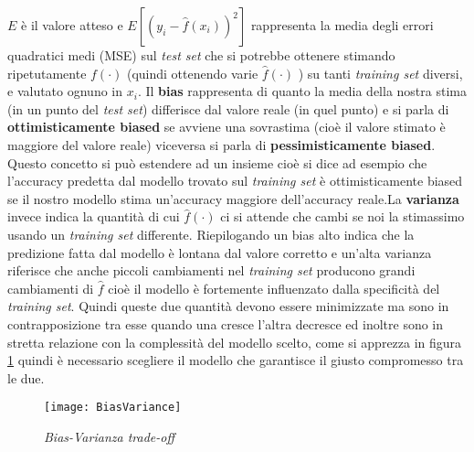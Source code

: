 $E$ è il valore atteso e $E[( y_i − \hat{f}(x_i) )^2]$  rappresenta la media degli errori quadratici medi (MSE) sul \textit{test set}  che si potrebbe ottenere stimando ripetutamente $f(\cdot)$ (quindi ottenendo varie $\hat{f}(\cdot)$ ) su tanti \textit{training set} diversi, e valutato ognuno in $x_i$. Il \textbf{bias} rappresenta di quanto la media della nostra stima (in un punto del \textit{test set}) differisce dal valore reale (in quel punto) e si parla di \textbf{ottimisticamente biased} se avviene una sovrastima (cioè il valore stimato è maggiore del valore reale) viceversa si parla di  \textbf{pessimisticamente biased}.  Questo concetto si può estendere ad un insieme cioè si dice ad esempio che l'accuracy predetta dal modello trovato sul \textit{training set} è ottimisticamente biased se il nostro modello stima un'accuracy maggiore dell'accuracy reale.La \textbf{varianza} invece indica la quantità di cui $\hat{f}(\cdot)$ ci si attende che cambi se noi la stimassimo usando un \textit{training set} differente. Riepilogando un bias alto indica che la predizione fatta dal modello è lontana dal valore corretto e un'alta varianza riferisce che anche piccoli cambiamenti nel \textit{training set} producono grandi cambiamenti di $\hat{f}$ cioè il modello è fortemente influenzato dalla specificità del \textit{training set}. Quindi queste due quantità devono essere minimizzate ma sono in contrapposizione tra esse quando una cresce l'altra decresce ed inoltre sono in stretta relazione con la complessità del modello scelto, come si apprezza in figura \ref{fig:bvtrd} quindi è necessario scegliere il modello che garantisce il  giusto compromesso tra le due.

\begin{figure}[htp]
	\centering
	\texttt{[image: BiasVariance]}
	\caption[Bias-Varianza trade-off]{\textit{Bias-Varianza trade-off}}
   \label{fig:bvtrd}
\end{figure}

